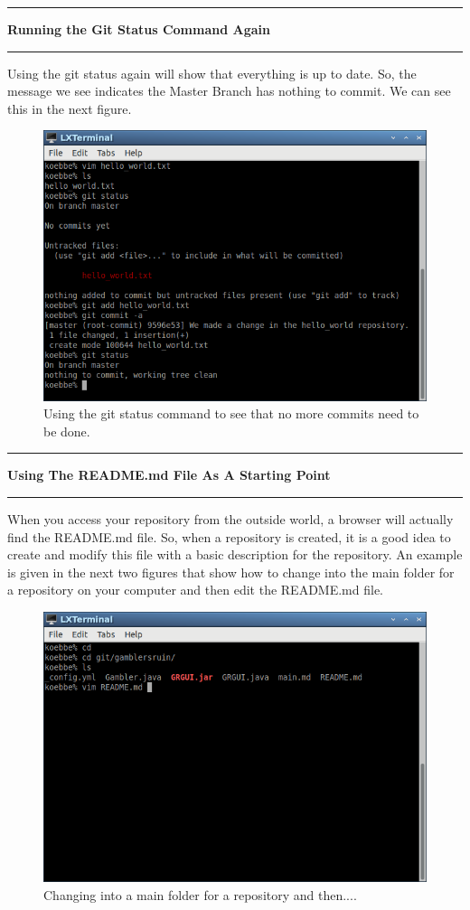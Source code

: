 \documentclass[10pt,fleqn]{article}
\begin{document}
\eject
\vskip0.1in\hrule\vskip0.1in\noindent
{\bf Running the Git Status Command Again} 
\vskip0.1in\hrule\vskip0.1in\noindent
Using the git status again will show that everything is up to date. So, the
message we see indicates the Master Branch has nothing to commit. We can see
this in the next figure.
\vfill
\begin{figure}[h]
\centering
\includegraphics[width=5.0in]{../images/git_10.png}
\caption{Using the git status command to see that no more commits need to be
done.}
\end{figure}
\eject
\vskip0.1in\hrule\vskip0.1in\noindent
{\bf Using The README.md File As A Starting Point} 
\vskip0.1in\hrule\vskip0.1in\noindent
When you access your repository from the outside world, a browser will actually
find the README.md file. So, when a repository is created, it is a good idea
to create and modify this file with a basic description for the repository. An
example is given in the next two figures that show how to change into the main
folder for a repository on your computer and then edit the README.md file.
\vfill
\begin{figure}[h]
\centering
\includegraphics[width=5.0in]{../images/git_11.png}
\caption{Changing into a main folder for a repository and then....}
\end{figure}
\end{document}
